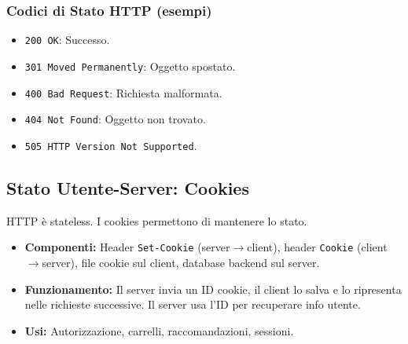\subsubsection{Codici di Stato HTTP (esempi)}
\begin{itemize}
    \item \texttt{200 OK}: Successo.
    \item \texttt{301 Moved Permanently}: Oggetto spostato.
    \item \texttt{400 Bad Request}: Richiesta malformata.
    \item \texttt{404 Not Found}: Oggetto non trovato.
    \item \texttt{505 HTTP Version Not Supported}.
\end{itemize}

\subsection{Stato Utente-Server: Cookies}
HTTP è stateless. I cookies permettono di mantenere lo stato.
\begin{itemize}
    \item \textbf{Componenti:} Header \texttt{Set-Cookie} (server$\rightarrow$client), header \texttt{Cookie} (client$\rightarrow$server), file cookie sul client, database backend sul server.
    \item \textbf{Funzionamento:} Il server invia un ID cookie, il client lo salva e lo ripresenta nelle richieste successive. Il server usa l'ID per recuperare info utente.
    \item \textbf{Usi:} Autorizzazione, carrelli, raccomandazioni, sessioni.
\end{itemize}
